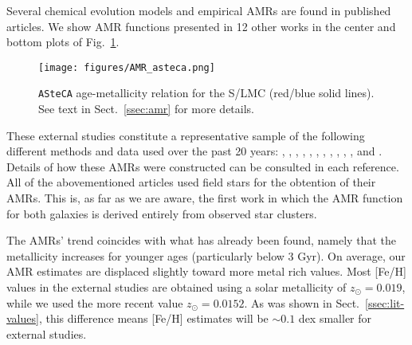 \documentclass{aa}
\begin{document}
Several chemical evolution models and empirical AMRs are found in published
articles.
We show AMR functions presented in 12 other works in the center and bottom plots
of Fig.~\ref{fig:amr}.
%
\begin{figure}
\centering
\texttt{[image: figures/AMR\_asteca.png]}
\caption{\texttt{ASteCA} age-metallicity relation for the S/LMC (red/blue
solid lines). See text in Sect.~\ref{ssec:amr} for more details.}
\label{fig:amr}
\end{figure}
%
These external studies constitute a representative sample of the following
different methods and data used over the past 20 years:
\citet[][PT98; bursting models]{Pagel_1998}, \citet[][G98; closed-box model
with Holtzman SFH]{Geha_1998}, \citet[][HZ04]{Harris_2004}, \citet[][C08a;
average of four disk frames]{Carrera_2008_lmc}, \citet[][C08b; average of
13 frames]{Carrera_2008_smc}, \citet[][HZ09]{Harris_2009}, \citet[][N09;
5th degree polynomial fit to the AMRs of their three observed regions]
{Noel_2009}, \citet[][TB09; 1: no merger model, 2: equal mass merger, 3: one
to four merger]{Tsujimoto_2009}, \citet[][R12; four tiles average]{Rubele_2012},
\citet[][C13; B: Bologna, C: Cole]{Cignoni_2013}, \citet[][PG13]
{Piatti_Geisler_2013}, and \citet[][M14; 0: field LMC0, 1: field LMC1, 2: field
LMC2]{Meschin_2014}.
Details of how these AMRs were constructed can be consulted in each reference.
%
All of the abovementioned articles used field stars for the obtention
of their AMRs. This is, as far as we are aware, the first work in which the AMR
function for both galaxies is derived entirely from observed star clusters.


The AMRs' trend coincides with what has already been found, namely that the
metallicity increases for younger ages (particularly below 3 Gyr). On average,
our AMR estimates are displaced slightly toward more metal rich values.
Most [Fe/H] values in the external studies are obtained using a solar
metallicity of $z_{\odot}{=}0.019$, while we used the more recent value
$z_{\odot}{=}0.0152$. As was shown in Sect.~\ref{ssec:lit-values}, this
difference means [Fe/H] estimates will be ${\sim}0.1$ dex smaller for external
studies.
\end{document}
